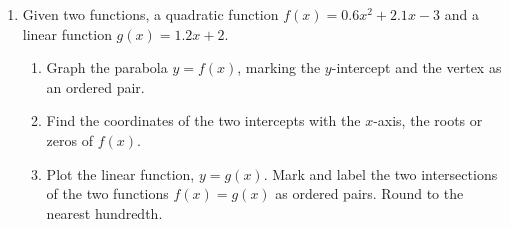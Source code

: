 \documentclass[12pt, twoside]{article}
\begin{document}
\begin{enumerate}
    \item Given two functions, a quadratic function $f(x)=0.6x^2+2.1x-3$ and a linear function $g(x)=1.2x+2$.
    \begin{enumerate}%
        \item Graph the parabola $y=f(x)$, marking the $y$-intercept and the vertex as an ordered pair.
        \item Find the coordinates of the two intercepts with the $x$-axis, the roots or zeros of $f(x)$.\vspace{1cm}
        \item Plot the linear function, $y=g(x)$. Mark and label the two intersections of the two functions $f(x)=g(x)$ as ordered pairs. Round to the nearest hundredth.
    \end{enumerate}
    \begin{center}
    \end{center}


\end{enumerate}
\end{document}
